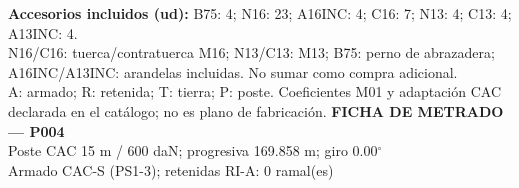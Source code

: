 \begingroup\scriptsize
\textbf{Accesorios incluidos (ud):} B75: 4; N16: 23; A16INC: 4; C16: 7; N13: 4; C13: 4; A13INC: 4.\\
N16/C16: tuerca/contratuerca M16; N13/C13: M13; B75: perno de abrazadera; A16INC/A13INC: arandelas incluidas. No sumar como compra adicional.\\
A: armado; R: retenida; T: tierra; P: poste. Coeficientes M01 y adaptación CAC declarada en el catálogo; no es plano de fabricación.
\endgroup\endgroup
\clearpage{}
\begingroup\small\setlength{\parskip}{3pt}\renewcommand{\arraystretch}{1.05}
\textbf{\large FICHA DE METRADO — P004}\\[4pt]
Poste CAC 15 m / 600 daN; progresiva 169.858 m; giro 0.00\ensuremath{^\circ}\\
Armado CAC-S (PS1-3); retenidas RI-A: 0 ramal(es)\\
\begingroup\scriptsize
